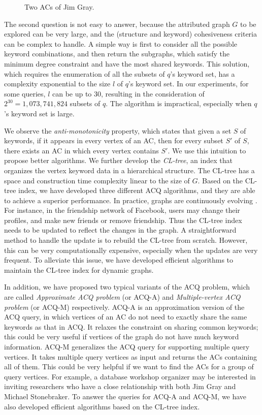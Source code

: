 \begin{figure}[ht]
{{            \label{fig:jim2}
        }
    }
    \caption{Two ACs of Jim Gray.}\label{fig:jim}
\end{figure}

The second question is not easy to answer, because the attributed graph $G$ to be explored can be very large, and the (structure and keyword) cohesiveness criteria can be complex to handle. A simple way is first to consider all the possible keyword combinations, and then return the subgraphs, which satisfy the minimum degree constraint and have the most shared keywords. This solution, which requires the enumeration of all the subsets of $q$'s keyword set, has a complexity exponential to the size $l$ of $q$'s keyword set. In our experiments, for some queries, $l$ can be up to 30, resulting in the consideration of $2^{30}=1,073,741,824$ subsets of $q$. The algorithm is impractical, especially when $q$'s keyword set is large.

{\color{blue}
We observe the {\it anti-monotonicity} property, which states that given a set $S$ of keywords, if it appears in every vertex of an AC, then for every subset $S'$ of $S$, there exists an AC in which every vertex contains $S'$. We use this intuition to propose better algorithms. We further develop the \emph{CL-tree}, an index that organizes the vertex keyword data in a hierarchical structure. The CL-tree has a space and construction time complexity linear to the size of $G$.
Based on the CL-tree index, we have developed three different ACQ algorithms, and they are able to achieve a superior performance.
In practice, graphs are continuously evolving \cite{chenghui,kddEvolving}. For instance, in the friendship network of Facebook, users may change their profiles, and make new friends or remove friendship. Thus the CL-tree index needs to be updated to reflect the changes in the graph. A straightforward method to handle the update is to rebuild the CL-tree from scratch. However, this can be very computationally expensive, especially when the updates are very frequent. To alleviate this issue, we have developed efficient algorithms to maintain the CL-tree index for dynamic graphs.

In addition, we have proposed two typical variants of the ACQ problem, which are called {\it Approximate ACQ problem} (or ACQ-A) and {\it Multiple-vertex ACQ problem} (or ACQ-M) respectively.
ACQ-A is an approximation version of the ACQ query, in which vertices of an AC do not need to exactly share the same keywords as that in ACQ. It relaxes the constraint on sharing common keywords; this could be very useful if vertices of the graph do not have much keyword information.
ACQ-M generalizes the ACQ query for supporting multiple query vertices. It takes multiple query vertices as input and returns the ACs containing all of them. This could be very helpful if we want to find the ACs for a group of query vertices. For example, a database workshop organizer may be interested in inviting researchers who have a close relationship with both Jim Gray and Michael Stonebraker.
To answer the queries for ACQ-A and ACQ-M, we have also developed efficient algorithms based on the CL-tree index.
}

